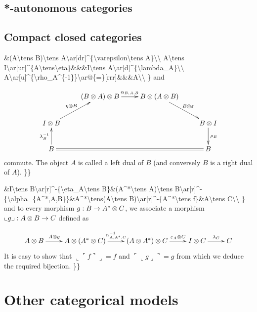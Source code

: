 \subsection{*-autonomous categories}\label{autonomous-categories}

\subsection{Compact closed categories}\label{compact-closed-categories}

\&(A\textbackslash{}tens B)\textbackslash{}tens
A\textbackslash{}ar{[}dr{]}\^{}\{\textbackslash{}varepsilon\textbackslash{}tens
A\}\textbackslash{}\textbackslash{} A\textbackslash{}tens
I\textbackslash{}ar{[}ur{]}\^{}\{A\textbackslash{}tens\textbackslash{}eta\}\&\&\&I\textbackslash{}tens
A\textbackslash{}ar{[}d{]}\^{}\{\textbackslash{}lambda\_A\}\textbackslash{}\textbackslash{}
A\textbackslash{}ar{[}u{]}\^{}\{\textbackslash{}rho\_A\^{}\{-1\}\}\textbackslash{}ar@\{=\}{[}rrr{]}\&\&\&A\textbackslash{}\textbackslash{}
\} and

\[\xymatrix{
& (B\tens A)\tens B\ar[r]^{\alpha_{B,A,B}}& B\tens(A\tens B)\ar[dr]^{B\tens\varepsilon}\\
I\tens B\ar[ur]^{\eta\tens B}& & & B\tens I\ar[d]^{\rho_B}\\
B\ar[u]^{\lambda_B^{-1}}\ar@{=}[rrr]& & & B\\
}\] commute. The object \(A\) is called a left dual of \(B\) (and
conversely \(B\) is a right dual of \(A\)). \}\}

\&I\textbackslash{}tens
B\textbackslash{}ar{[}r{]}\^{}-\{\textbackslash{}eta\_A\textbackslash{}tens
B\}\&(A\^{}*\textbackslash{}tens A)\textbackslash{}tens
B\textbackslash{}ar{[}r{]}\^{}-\{\textbackslash{}alpha\_\{A\^{}*,A,B\}\}\&A\^{}*\textbackslash{}tens(A\textbackslash{}tens
B)\textbackslash{}ar{[}r{]}\^{}-\{A\^{}*\textbackslash{}tens
f\}\&A\textbackslash{}tens C\textbackslash{}\textbackslash{} \} and to
every morphism \(g:B\to A^*\otimes C\), we associate a morphism
\(\llcorner g\lrcorner:A\otimes B\to C\) defined as

\[\xymatrix{
A\tens B\ar[r]^-{A\tens g}& A\tens(A^*\tens C)\ar[r]^-{\alpha_{A,A^*,C}^{-1}}& (A\tens A^*)\tens C\ar[r]^-{\varepsilon_A\tens C}& I\tens C\ar[r]^-{\lambda_C}& C
}\] It is easy to show that
\(\llcorner \ulcorner f\urcorner\lrcorner=f\) and
\(\ulcorner\llcorner g\lrcorner\urcorner=g\) from which we deduce the
required bijection. \}\}

\section{Other categorical models}\label{other-categorical-models}

